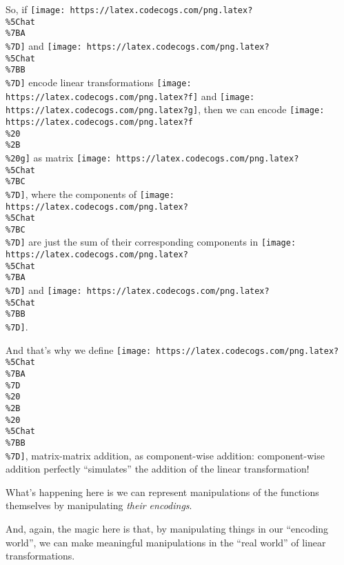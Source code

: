 \documentclass[]{article}
\begin{document}
So, if \texttt{[image: https://latex.codecogs.com/png.latex?\\\%5Chat\\\%7BA\\\%7D]}
and \texttt{[image: https://latex.codecogs.com/png.latex?\\\%5Chat\\\%7BB\\\%7D]}
encode linear transformations
\texttt{[image: https://latex.codecogs.com/png.latex?f]} and
\texttt{[image: https://latex.codecogs.com/png.latex?g]}, then we can encode
\texttt{[image: https://latex.codecogs.com/png.latex?f\\\%20\\\%2B\\\%20g]} as matrix
\texttt{[image: https://latex.codecogs.com/png.latex?\\\%5Chat\\\%7BC\\\%7D]}, where
the components of
\texttt{[image: https://latex.codecogs.com/png.latex?\\\%5Chat\\\%7BC\\\%7D]} are just
the sum of their corresponding components in
\texttt{[image: https://latex.codecogs.com/png.latex?\\\%5Chat\\\%7BA\\\%7D]} and
\texttt{[image: https://latex.codecogs.com/png.latex?\\\%5Chat\\\%7BB\\\%7D]}.

And that's why we define
\texttt{[image: https://latex.codecogs.com/png.latex?\\\%5Chat\\\%7BA\\\%7D\\\%20\\\%2B\\\%20\\\%5Chat\\\%7BB\\\%7D]},
matrix-matrix addition, as component-wise addition: component-wise addition
perfectly ``simulates'' the addition of the linear transformation!

What's happening here is we can represent manipulations of the functions
themselves by manipulating \emph{their encodings}.

And, again, the magic here is that, by manipulating things in our ``encoding
world'', we can make meaningful manipulations in the ``real world'' of linear
transformations.
\end{document}
